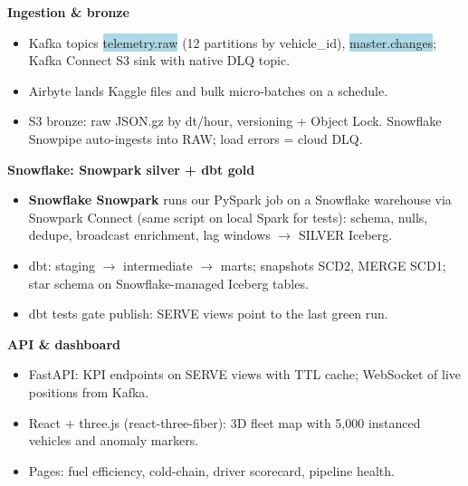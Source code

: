 \documentclass[10pt,a4paper]{article}
\newcommand{\code}[1]{\colorbox{lightblue}{\ttfamily\scriptsize #1}}
\begin{document}
\begin{tcbraster}[raster columns=3, raster equal height, raster column skip=6pt, colback=white, colframe=cardline, boxrule=0.6pt, arc=3pt, left=4pt, right=4pt, top=3pt, bottom=3pt, fontupper=\footnotesize\raggedright]
\begin{tcolorbox}
{\small\bfseries\color{navy}Ingestion \& bronze\par}\vspace{2pt}
\begin{itemize}
\item Kafka topics \code{telemetry.raw} (12 partitions by vehicle\_id), \code{master.changes}; Kafka Connect S3 sink with native DLQ topic.
\item Airbyte lands Kaggle files and bulk micro-batches on a schedule.
\item S3 bronze: raw JSON.gz by dt/hour, versioning + Object Lock. Snowflake Snowpipe auto-ingests into RAW; load errors = cloud DLQ.
\end{itemize}
\end{tcolorbox}
\begin{tcolorbox}
{\small\bfseries\color{navy}Snowflake: Snowpark silver + dbt gold\par}\vspace{2pt}
\begin{itemize}
\item \textbf{Snowflake Snowpark} runs our PySpark job on a Snowflake warehouse via Snowpark Connect (same script on local Spark for tests): schema, nulls, dedupe, broadcast enrichment, lag windows $\rightarrow$ SILVER Iceberg.
\item dbt: staging $\rightarrow$ intermediate $\rightarrow$ marts; snapshots SCD2, MERGE SCD1; star schema on Snowflake-managed Iceberg tables.
\item dbt tests gate publish: SERVE views point to the last green run.
\end{itemize}
\end{tcolorbox}
\begin{tcolorbox}
{\small\bfseries\color{navy}API \& dashboard\par}\vspace{2pt}
\begin{itemize}
\item FastAPI: KPI endpoints on SERVE views with TTL cache; WebSocket of live positions from Kafka.
\item React + three.js (react-three-fiber): 3D fleet map with 5,000 instanced vehicles and anomaly markers.
\item Pages: fuel efficiency, cold-chain, driver scorecard, pipeline health.
\end{itemize}
\end{tcolorbox}
\end{tcbraster}
\end{document}
